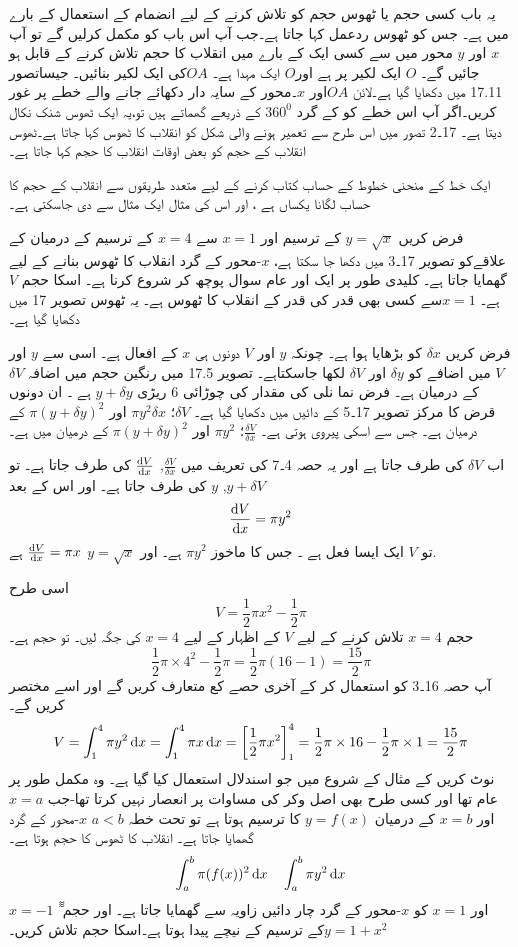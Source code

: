 
 یہ باب کسی حجم یا ٹھوس حجم کو تلاش کرنے کے لیے انضمام کے استعمال کے بارے میں ہے۔ جس کو ٹھوس ردعمل کہا جاتا ہے۔جب آپ اس باب کو مکمل کرلیں گے تو آپ \(x\) اور \(y\) محور میں سے کسی ایک کے بارے میں انقلاب کا حجم تلاش کرنے کے قابل ہو جائیں گے۔
 \(O\) ایک لکیر پر ہے اور\(O\) ایک مہدا ہے۔
\(OA\)کی ایک لکیر بنائیں۔
جیساتصور 17.11 میں دکھایا گیا ہے۔لائن \(OA\)اور \(x\)۔محور کے سایہ دار دکھائے جانے والے خطے پر غور کریں۔اگر آپ اس خطے کو کے گرد \(360^0\) کے ذریعے گھماتے ہیں تو،یہ ایک ٹھوس شنک نکال دیتا ہے۔ 17۔2 تصور میں اس طرح سے تعمیر ہونے والی شکل کو انقلاب کا ٹھوس کہا جاتا ہے۔ٹھوس انقلاب کے حجم کو بعض اوقات انقلاب کا حجم کہا جاتا ہے۔

ایک خط کے منحنی خطوط کے حساب کتاب کرنے کے لیے متعدد طریقوں سے انقلاب کے حجم کا حساب لگانا یکساں ہے ، اور اس کی مثال ایک مثال سے دی جاسکتی ہے۔

فرض کریں \(y=\sqrt{x}\) کے ترسیم اور \(x=1\) سے \(x=4\) کے ترسیم کے درمیان کے علاقےکو تصویر 17۔3 میں دکھا جا سکتا ہے، \(x\)-محور کے گرد انقلاب کا ٹھوس بنانے کے لیے گھمایا جاتا ہے۔%
کلیدی طور پر ایک اور عام سوال پوچھ کر شروع کرنا ہے۔ اسکا حجم \(V\) ہے۔ \(x=1\)سے کسی بھی قدر کی قدر کے انقلاب کا ٹھوس ہے۔ یہ ٹھوس تصویر 17 میں دکھایا گیا ہے۔

فرض کریں \(\delta{x}\) کو بڑھایا ہوا ہے۔ چونکہ \(y\) اور \(V\) دونوں ہی \(x\) کے افعال ہے۔ اسی سے \(y\)  اور \(V\)  میں اضافے کو  \(\delta{y}\) اور \(\delta{V}\) لکھا جاسکتاہے۔ تصویر 17.5 میں رنگین حجم  میں اضافہ \(\delta{V}\)کے درمیان ہے۔ فرض نما نلی کی مقدار کی چوڑائی 6 ریڑی \(y+\delta{y}\) ہے ۔ ان دونوں قرض کا مرکز  تصویر 17۔5 کے دائیں میں دکھایا گیا ہے۔ \(\delta{V}\)؛  \(\pi y^{2}\delta{x}\) اور \(\pi(y+\delta{y})^{2}\) کے درمیان ہے۔ جس سے اسکی پیروی ہوتی ہے۔ \(\frac{\delta{V}}{\delta{x}}\)؛ \(\pi y^{2}\) اور \(\pi(y+\delta{y})^{2}\) کے درمیان میں ہے۔

اب \(\delta{V}\)  کی طرف جاتا ہے اور یہ حصہ 4۔7 کی تعریف میں \(\frac{\delta{V}}{\delta{x}}\), \(\frac{\dif{V}}{\dif{x}}\)  کی طرف جاتا ہے۔ تو \(y+\delta{V}\), \(y\) کی طرف جاتا ہے۔ اور اس کے بعد 
\[\frac{\dif{V}}{\dif{x}}=\pi y^{2}\]
تو  \(V\) ایک ایسا فعل ہے ۔ جس کا ماخوز \(\pi y^{2}\) ہے۔ اور \(y=\sqrt{x}\)
 \(\frac{\dif{V}}{\dif{x}}=\pi x\) ہے.

اسی طرح
\[V=\frac{1}{2}\pi x^{2} - \frac{1}{2}\pi\]
حجم \(x=4\) تلاش کرنے کے لیے \(V\) کے اظہار کے لیے \(x=4\) کی جگہ لیں۔ تو حجم ہے۔
\[\frac{1}{2}\pi\times4^{2}-\frac{1}{2}\pi = \frac{1}{2}\pi(16-1)=\frac{15}{2}\pi\]
آپ حصہ 16۔3 کو استعمال کر کے آخری حصے کع متعارف کریں گے اور اسے مختصر کریں گے۔
\[V=\int_{1}^{4}\pi y^{2}\dif{x}=\int_{1}^{4}\pi x\dif{x} =\left[\frac{1}{2}\pi x^{2}\right]_{1}^{4}=\frac{1}{2}\pi\times16-\frac{1}{2}\pi\times1=\frac{15}{2}\pi\]
نوٹ کریں کے مثال کے شروع میں جو اسندلال استعمال کیا گیا ہے۔ وہ مکمل طور پر عام تھا اور کسی طرح بھی  اصل وکر کی مساوات پر انعصار نہیں کرتا تھا-جب  \( x=a\) اور \(x=b\) کے درمیان \(y=f(x)\) کا ترسیم ہوتا ہے تو تحت خطہ \(a<b\) \(x\)-محور  کے گرد گھمایا جاتا ہے۔ انقلاب کا ٹھوس کا حجم ہوتا ہے۔
\[\int_{a}^{b}\pi(f(x))^2\dif{x}\quad\int_{a}^{b}\pi y^{2}\dif{x}\]
\(x=-1\) اور \( x=1\) کو \(x\)-محور کے گرد چار دائیں زاویہ سے گھمایا  جاتا ہے۔ اور حجم ٓٓٓ\(y=1+x^{2}\)کے ترسیم کے نیچے پیدا ہوتا ہے۔اسکا حجم تلاش کریں۔

